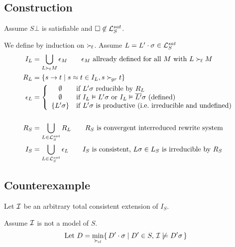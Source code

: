 \documentclass[%
handout,
]{beamer}
\begin{document}
\subsection{Construction}
\begin{frame}
    Assume $S\bot$ is satisfiable and
    $\square\not\in\mathcal{L}_S^{sat}$.

    We define by induction on $\mathrel\succ_{\!\ell}$.
    Assume $L = L'\cdot\sigma \in\mathcal{L}_S^{sat}$
    \begin{align*}
        I_L &= \bigcup_{L\succL M}\epsilon_M
        \tag*{$\epsilon_M$ allready defined for all $M$ with $L\succL M$}
        \\
        R_L &= \{ s \to t \mid s\mEQ t\in I_L, s\succG t \}
        \\
        \epsilon_L &= \left\{
            \begin{array}{cl}
                \emptyset &\text{if }
                L'\sigma\text{ reducible by }R_L
                \\
                \emptyset &\text{if }
                I_L\vDash L'\sigma
                \text{ or }
                I_L\vDash \overline{L'}\sigma
                \text{ (defined)}
                \\
                \{ L'\sigma \}
                &\text{if }L'\sigma \text{ is productive (i.e.~irreducible and undefined)}
            \end{array}
        \right.\\[1.4em]
        R_S &= \bigcup_{L\in\mcL_S^{sat}} R_L \tag*{$R_S$ is convergent interreduced rewrite system}
        \\
        I_S &= \bigcup_{L\in\mcL_S^{sat}} \epsilon_L \tag*{$I_S$ is consistent, $L\sigma\in L_S$ is irreducible by $R_S$}
    \end{align*}
\end{frame}

\subsection{Counterexample}
\begin{frame}
    Let $\mathcal{I}$ be an arbitrary total consistent extension of $I_S$.
    \vspace{1.4em}

    Assume $\mathcal{I}$ is not a model of $S$.
    \begin{align*}
        \text{Let }
        D &= \min_{\mathrel\succ_{\!cl}}\{\,
        D'\cdot\sigma \mid D'\in S,\,
        \mathcal{I}\not\models D'\sigma\,
        \}
    \end{align*}

    
\end{frame}
\end{document}
